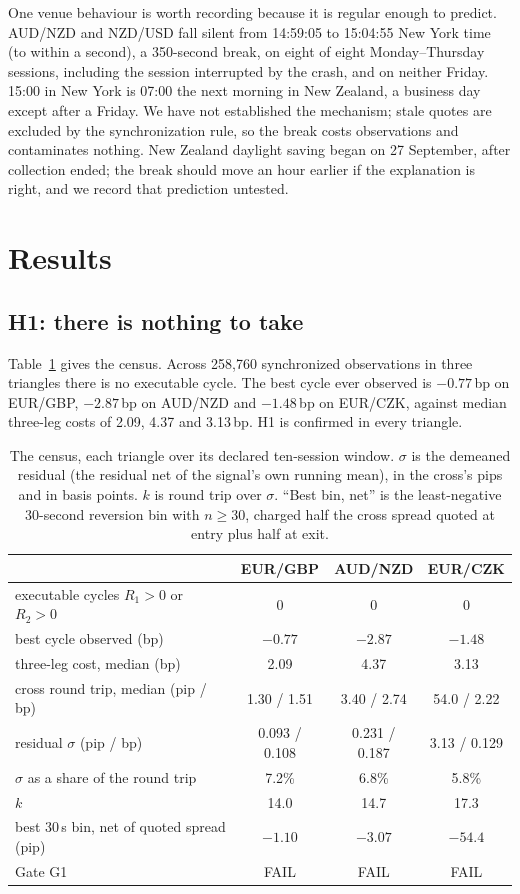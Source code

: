 \documentclass[11pt]{article}
\begin{document}
One venue behaviour is worth recording because it is regular enough to
predict. AUD/NZD and NZD/USD fall silent from 14:59:05 to 15:04:55 New
York time (to within a second), a 350-second break, on eight of eight
Monday--Thursday sessions, including the session interrupted by the crash, and on
neither Friday. 15:00 in New York is 07:00 the next morning in New
Zealand, a business day except after a Friday. We have not established
the mechanism; stale quotes are excluded by the synchronization rule,
so the break costs observations and contaminates nothing. New Zealand
daylight saving began on 27 September, after collection ended; the
break should move an hour earlier if the explanation is right, and we
record that prediction untested.

\section{Results}\label{sec:results}

\subsection{H1: there is nothing to take}

Table~\ref{tab:census} gives the census. Across 258{,}760 synchronized
observations in three triangles there is no executable cycle. The best
cycle ever observed is $-0.77$\,bp on EUR/GBP, $-2.87$\,bp on AUD/NZD
and $-1.48$\,bp on EUR/CZK, against median three-leg costs of 2.09,
4.37 and 3.13\,bp. H1 is confirmed in every triangle.

\begin{table}[t]
\centering
\caption{The census, each triangle over its declared ten-session
window. $\sigma$ is the demeaned residual (the residual net of the
signal's own running mean), in the cross's pips and in basis points.
$k$ is round trip over $\sigma$. ``Best bin, net'' is the
least-negative 30-second reversion bin with $n \ge 30$, charged half
the cross spread quoted at entry plus half at exit.}
\label{tab:census}
\begin{tabular}{lccc}
\toprule
 & EUR/GBP & AUD/NZD & EUR/CZK \\
\midrule
executable cycles $R_1>0$ or $R_2>0$ & 0 & 0 & 0 \\
best cycle observed (bp) & $-0.77$ & $-2.87$ & $-1.48$ \\
three-leg cost, median (bp) & 2.09 & 4.37 & 3.13 \\
cross round trip, median (pip / bp) & 1.30 / 1.51 & 3.40 / 2.74 & 54.0 / 2.22 \\
residual $\sigma$ (pip / bp) & 0.093 / 0.108 & 0.231 / 0.187 & 3.13 / 0.129 \\
$\sigma$ as a share of the round trip & 7.2\% & 6.8\% & 5.8\% \\
$k$ & 14.0 & 14.7 & 17.3 \\
best 30\,s bin, net of quoted spread (pip) & $-1.10$ & $-3.07$ & $-54.4$ \\
Gate G1 & FAIL & FAIL & FAIL \\
\bottomrule
\end{tabular}
\end{table}
\end{document}
